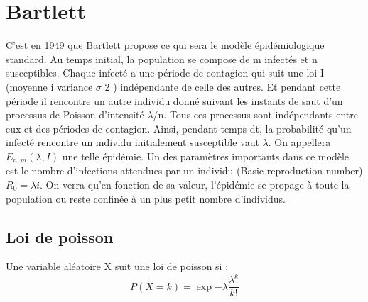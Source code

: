 \section{Bartlett}

C’est en 1949 que Bartlett propose ce qui sera le modèle épidémiologique standard. Au temps
initial, la population se compose de m infectés et n susceptibles. Chaque infecté a une période de
contagion qui suit une loi I (moyenne i variance $\sigma$ 2 ) indépendante de celle des autres. Et pendant
cette période il rencontre un autre individu donné suivant les instants de saut d’un processus de
Poisson d’intensité $\lambda$/n. Tous ces processus sont indépendants entre eux et des périodes de
contagion. Ainsi, pendant temps dt, la probabilité qu’un infecté rencontre un individu initialement
susceptible vaut $\lambda$. On appellera $E_{n,m}(\lambda, I)$ une telle épidémie. Un des paramètres importants dans
ce modèle est le nombre d’infections attendues par un individu (Basic reproduction number) $R_0 =
\lambda i$. On verra qu’en fonction de sa valeur, l’épidémie se propage à toute la population ou reste
confinée à un plus petit nombre d’individus.

\subsection{Loi de poisson}

Une variable aléatoire X suit une loi de poisson si :
$$ P(X=k) = \exp{-\lambda \frac{\lambda^k}{k!}} $$
